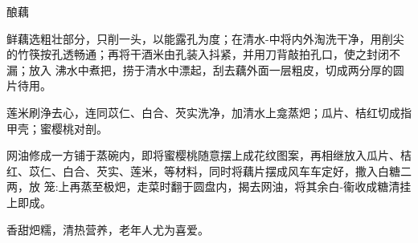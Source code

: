 \begin{recipe}[八宝酿藕]{酿藕}

\ingredients


\preparation

\step 鲜藕选粗壮部分，只削一头，以能露孔为度；在清水-中将内外淘洗干净，用削尖
的竹筷按孔透畅通；再将干酒米由孔装入抖紧，并用刀背敲拍孔口，使之封闭不漏；放入
沸水中煮把，捞于清水中漂起，刮去藕外面一层粗皮，切成两分厚的圆片待用。

\step 莲米刷浄去心，连同苡仁、白合、芡实洗净，加清水上龛蒸𤆵；瓜片、桔红切成指
甲壳；蜜樱桃对剖。

\step 网油修成一方铺于蒸碗内，即将蜜樱桃随意摆上成花纹图案，再相继放入瓜片、桔
红、苡仁、白合、芡实、莲米，等材料，同时将藕片摆成风车车定好，撒入白糖二两，放
笼:上再蒸至极𤆵，走菜时翻于圆盘内，揭去网油，将其余白-衞收成糖清挂上即成。

\features

香甜𤆵糯，清热营养，老年人尤为喜爱。

\end{recipe}

